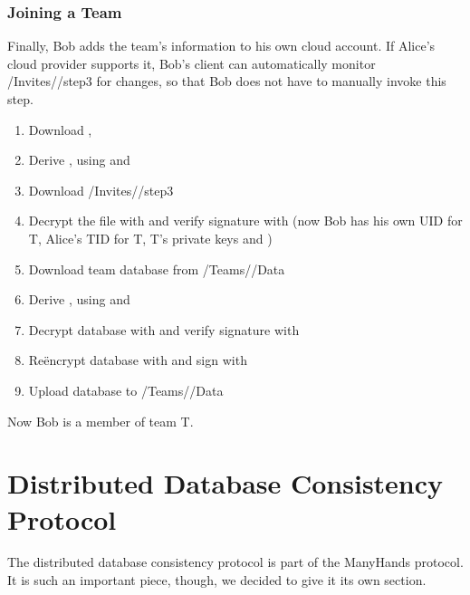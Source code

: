 \documentclass[pldi,10pt,preprint]{sigplanconf-pldi16}
\begin{document}
\subsubsection{Joining a Team}

Finally, Bob adds the team's information to his own cloud account.
If Alice's cloud provider supports it, Bob's client can automatically monitor \slash Invites\slash {}\slash step3 for changes, so that Bob does not have to manually invoke this step.

\begin{enumerate}
\item Download , 
\item Derive , using  and 
\item Download \slash Invites\slash {}\slash step3
\item Decrypt the file with  and verify signature with  (now Bob has his own UID for T, Alice's TID for T, T's private keys and )
\item Download team database from \slash Teams\slash {}\slash Data
\item Derive , using  and 
\item Decrypt database with  and verify signature with 
\item Re\"{e}ncrypt database with  and sign with 
\item Upload database to \slash Teams\slash {}\slash Data
\end{enumerate}

Now Bob is a member of team T.

\section{Distributed Database Consistency Protocol}

The distributed database consistency protocol is part of the ManyHands protocol.
It is such an important piece, though, we decided to give it its own section.
\end{document}
